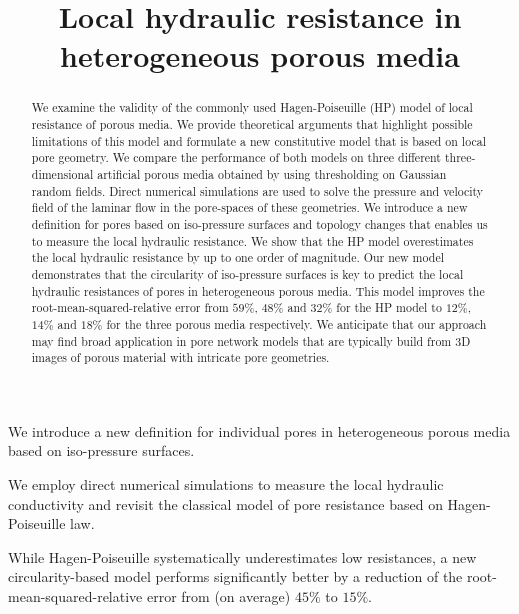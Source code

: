 \documentclass[draft]{agujournal2019}
\begin{document}
\title{Local hydraulic resistance in heterogeneous porous media}











\begin{keypoints}
\item We introduce a new definition for individual pores in heterogeneous porous media based on iso-pressure surfaces.
\item We employ direct numerical simulations to measure the local hydraulic conductivity and revisit the classical model of pore resistance based on Hagen-Poiseuille law. 
\item While Hagen-Poiseuille systematically underestimates low resistances, a new circularity-based model performs significantly better by a reduction of the root-mean-squared-relative error from (on average) $45\%$ to $15\%$.
\end{keypoints}


\begin{abstract}
We examine the validity of the commonly used Hagen-Poiseuille (HP) model of local resistance of porous media. We provide theoretical arguments that highlight possible limitations of this model and formulate a new constitutive model that is based on local pore geometry. We compare the performance of both models on three different three-dimensional artificial porous media obtained by using thresholding on Gaussian random fields. Direct numerical simulations are used to solve the pressure and velocity field of the laminar flow in the pore-spaces of these geometries. We introduce a new definition for pores based on iso-pressure surfaces and topology changes that enables us to measure the local hydraulic resistance. We show that the HP model overestimates the local hydraulic resistance by up to one order of magnitude. Our new model demonstrates that the circularity of iso-pressure surfaces is key to predict the local hydraulic resistances of pores in heterogeneous porous media. This model improves the root-mean-squared-relative error from $59\%$, $48\%$ and $32\%$ for the HP model to $12\%$, $14\%$ and $18\%$ for the three porous media respectively. We anticipate that our approach may find broad application in pore network models that are typically build from 3D images of porous material with intricate pore geometries.
\end{abstract}
\end{document}
